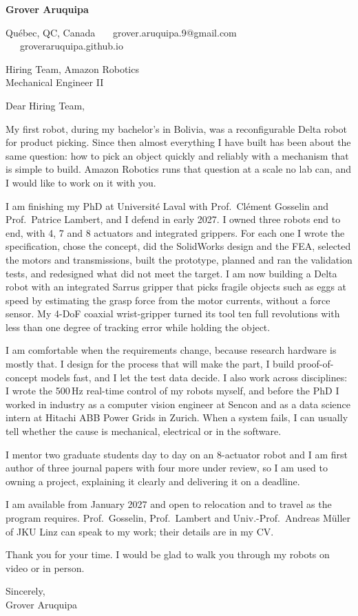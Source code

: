 \documentclass[11pt,letterpaper]{article}
\begin{document}
{\large\bfseries Grover Aruquipa}\par\vspace{-6pt}
{\small Qu\'ebec, QC, Canada \ \textbullet\ \ grover.aruquipa.9@gmail.com \ \textbullet\ \ groveraruquipa.github.io}

\vspace{4pt}
Hiring Team, Amazon Robotics\\
Mechanical Engineer II

Dear Hiring Team,

My first robot, during my bachelor's in Bolivia, was a reconfigurable Delta robot for product picking. Since then almost everything I have built has been about the same question: how to pick an object quickly and reliably with a mechanism that is simple to build. Amazon Robotics runs that question at a scale no lab can, and I would like to work on it with you.

I am finishing my PhD at Universit\'e Laval with Prof.\ Cl\'ement Gosselin and Prof.\ Patrice Lambert, and I defend in early 2027. I owned three robots end to end, with 4, 7 and 8 actuators and integrated grippers. For each one I wrote the specification, chose the concept, did the SolidWorks design and the FEA, selected the motors and transmissions, built the prototype, planned and ran the validation tests, and redesigned what did not meet the target. I am now building a Delta robot with an integrated Sarrus gripper that picks fragile objects such as eggs at speed by estimating the grasp force from the motor currents, without a force sensor. My 4-DoF coaxial wrist-gripper turned its tool ten full revolutions with less than one degree of tracking error while holding the object.

I am comfortable when the requirements change, because research hardware is mostly that. I design for the process that will make the part, I build proof-of-concept models fast, and I let the test data decide. I also work across disciplines: I wrote the 500\,Hz real-time control of my robots myself, and before the PhD I worked in industry as a computer vision engineer at Sencon and as a data science intern at Hitachi ABB Power Grids in Zurich. When a system fails, I can usually tell whether the cause is mechanical, electrical or in the software.

I mentor two graduate students day to day on an 8-actuator robot and I am first author of three journal papers with four more under review, so I am used to owning a project, explaining it clearly and delivering it on a deadline.

I am available from January 2027 and open to relocation and to travel as the program requires. Prof.\ Gosselin, Prof.\ Lambert and Univ.-Prof.\ Andreas M\"uller of JKU Linz can speak to my work; their details are in my CV.

Thank you for your time. I would be glad to walk you through my robots on video or in person.

Sincerely,\\
Grover Aruquipa
\end{document}
